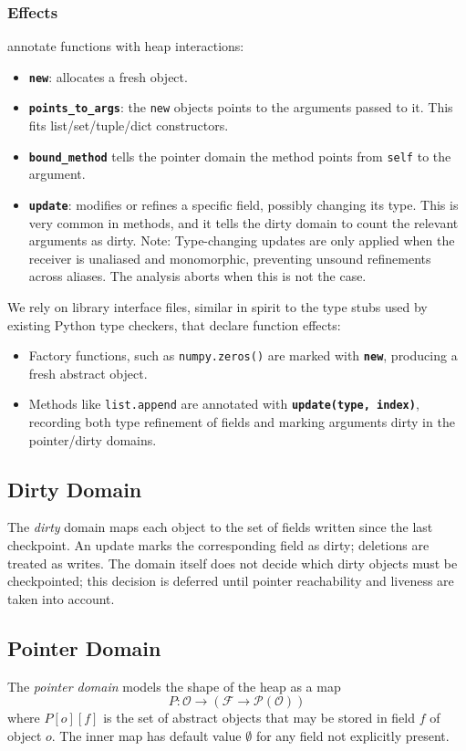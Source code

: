 \subsubsection{Effects} annotate functions with heap interactions:
\begin{itemize}
  \item \textbf{\texttt{new}}: allocates a fresh object.
  \item \textbf{\texttt{points\_to\_args}}: the \texttt{new} objects points to the arguments passed to it. This fits list/set/tuple/dict constructors.
  \item \textbf{\texttt{bound\_method}} tells the pointer domain the method points from \texttt{self} to the argument.
  \item \textbf{\texttt{update}}: modifies or refines a specific field, possibly changing its type. This is very common in methods, and it tells the dirty domain to count the relevant arguments as dirty. Note: Type-changing updates are only applied when the receiver is unaliased and monomorphic, preventing unsound refinements across aliases. The analysis aborts when this is not the case.
\end{itemize}

We rely on library interface files, similar in spirit to the type stubs used by existing Python type checkers, that declare function effects:

\begin{itemize}
  \item Factory functions, such as \texttt{numpy.zeros()} are marked with \textbf{\texttt{new}}, producing a fresh abstract object.
  \item Methods like \texttt{list.append} are annotated with \textbf{\texttt{update(type, index)}}, recording both type refinement of fields and marking arguments dirty in the pointer/dirty domains.
\end{itemize}

\subsection{Dirty Domain}
The \emph{dirty} domain maps each object to the set of fields written since the last checkpoint.
An update marks the corresponding field as dirty; deletions are treated as writes.
The domain itself does not decide which dirty objects must be checkpointed; this decision is deferred until pointer reachability and liveness are taken into account.

\subsection{Pointer Domain}
The \emph{pointer domain} models the shape of the heap as a map
\[
P : \mathcal{O} \to (\mathcal{F} \to \mathcal{P}(\mathcal{O}))
\]
where $P[o][f]$ is the set of abstract objects that may be stored in field $f$ of object $o$.
The inner map has default value $\emptyset$ for any field not explicitly present.


